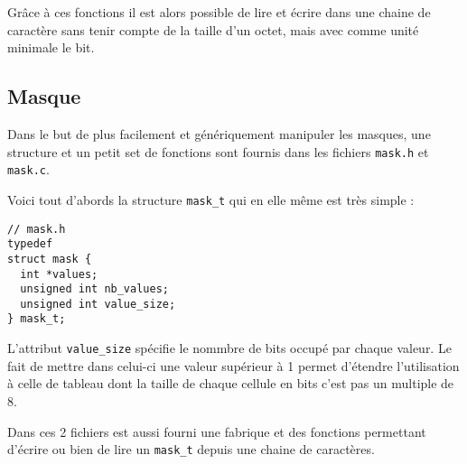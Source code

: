 Grâce à ces fonctions il est alors possible de lire et écrire dans une chaine de caractère sans tenir compte de la taille d'un octet, mais avec comme unité minimale le bit.


\subsection{Masque}
Dans le but de plus facilement et génériquement manipuler les masques, une structure et un petit set de fonctions sont fournis dans les fichiers \texttt{mask.h} et \texttt{mask.c}.

Voici tout d'abords la structure \texttt{mask\_t} qui en elle même est très simple :
\lstset{language=C}
\begin{lstlisting}
// mask.h
typedef
struct mask {
  int *values;
  unsigned int nb_values;
  unsigned int value_size;
} mask_t;
\end{lstlisting}

L'attribut \texttt{value\_size} spécifie le nommbre de bits occupé par chaque valeur. Le fait de mettre dans celui-ci une valeur supérieur à 1 permet d'étendre l'utilisation à celle de tableau dont la taille de chaque cellule en bits c'est pas un multiple de 8.

Dans ces 2 fichiers est aussi fourni une fabrique et des fonctions permettant d'écrire ou bien de lire un \texttt{mask\_t} depuis une chaine de caractères.
